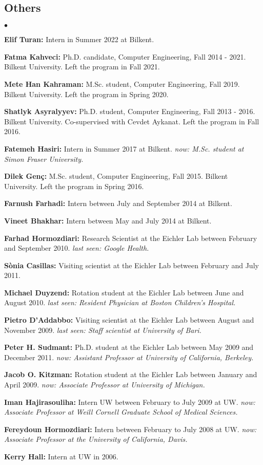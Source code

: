 \documentclass[margin,line]{res}
\newenvironment{list2}{
  \begin{list}{$\bullet$}{%
      \setlength{\itemsep}{0.1cm}
      \setlength{\parsep}{0in} \setlength{\parskip}{0in}
      \setlength{\topsep}{0in} \setlength{\partopsep}{0in} 
      \setlength{\leftmargin}{0.2in}}}{\end{list}}
\begin{document}
\begin{resume}
\subsection{\small \sc Others}
\begin{list2}
\item
  {\bf Elif Turan:} Intern in Summer 2022 at Bilkent.  
\item
  {\bf Fatma Kahveci:} Ph.D. candidate, Computer Engineering, Fall 2014 - 2021. 
  Bilkent University. Left the program in Fall 2021.
\item
  {\bf Mete Han Kahraman:} M.Sc. student, Computer Engineering, Fall 2019.  
  Bilkent University. Left the program in Spring 2020.
\item
  {\bf Shatlyk Asyralyyev:} Ph.D. student, Computer Engineering, Fall 2013 - 2016.
  Bilkent University. Co-supervised with Cevdet Aykanat. Left the program in Fall 2016.
\item
  {\bf Fatemeh Hasiri:} Intern in Summer 2017 at Bilkent.   {\it now: M.Sc. student at Simon Fraser University.}

\item
{\bf Dilek Genç:} M.Sc. student, Computer Engineering, Fall 2015.
  Bilkent University. Left the program in Spring 2016. 
\item
  {\bf Farnush Farhadi:} Intern between July and September 2014 at Bilkent.
\item
  {\bf Vineet Bhakhar:} Intern between May and July 2014 at Bilkent. 
  
\item
  {\bf Farhad Hormozdiari:} Research Scientist at the Eichler Lab between February and September 2010.
  {\it last seen: Google Health.}
\item
  {\bf S\`{o}nia Casillas:} Visiting scientist at the Eichler Lab between February and July 2011.
\item
  {\bf Michael Duyzend:} Rotation student at the Eichler Lab between June and August 2010.
  {\it last seen:  Resident Physician at Boston Children's Hospital.}
\item
  {\bf Pietro D'Addabbo:} Visiting scientist at the Eichler Lab between August and November 2009.
  {\it last seen: Staff scientist at University of Bari.}
\item
  {\bf Peter H. Sudmant:} Ph.D. student at the Eichler Lab between May 2009 and December 2011.
  {\it now: Assistant Professor at University of California, Berkeley.}
\item
  {\bf Jacob O. Kitzman:} Rotation student at the Eichler Lab between January and April 2009.
  {\it now: Associate Professor at University of Michigan.}
\item
  {\bf Iman Hajirasouliha:}  Intern UW between February to July 2009 at UW.
  {\it now: Associate Professor at Weill Cornell Graduate School of Medical Sciences.}
\item
  {\bf Fereydoun Hormozdiari:} Intern between February to July 2008 at UW. 
  {\it now: Associate Professor at the University of California, Davis.}
\item
  {\bf Kerry Hall:} Intern at UW in 2006.  
\end{list2}



\end{resume}
\end{document}
